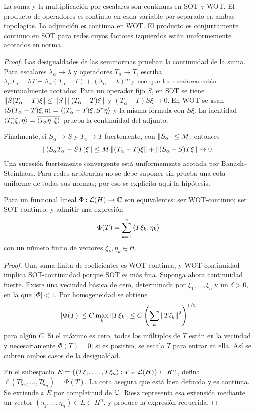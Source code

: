 \begin{proposicion}\label{v3:operaciones-topologias}
La suma y la multiplicación por escalares son continuas en SOT y WOT. El producto de operadores es continuo en cada variable por separado en ambas topologías. La adjunción es continua en WOT. El producto es conjuntamente continuo en SOT para redes cuyos factores izquierdos están uniformemente acotados en norma.
\end{proposicion}
\begin{proof}
Las desigualdades de las seminormas prueban la continuidad de la suma. Para escalares $\lambda_\alpha\to\lambda$ y operadores $T_\alpha\to T$, escriba
$\lambda_\alpha T_\alpha-\lambda T=\lambda_\alpha(T_\alpha-T)+(\lambda_\alpha-\lambda)T$ y use que los escalares están eventualmente acotados. Para un operador fijo $S$, en SOT se tiene $\left\lVert S(T_\alpha-T)\xi\right\rVert\le\left\lVert S\right\rVert\left\lVert(T_\alpha-T)\xi\right\rVert$ y $(T_\alpha-T)S\xi\to0$. En WOT se usan $\left\langle S(T_\alpha-T)\xi,\eta\right\rangle=\left\langle(T_\alpha-T)\xi,S^*\eta\right\rangle$ y la misma fórmula con $S\xi$. La identidad $\left\langle T_\alpha^*\xi,\eta\right\rangle=\overline{\left\langle T_\alpha\eta,\xi\right\rangle}$ prueba la continuidad del adjunto.

Finalmente, si $S_\alpha\to S$ y $T_\alpha\to T$ fuertemente, con $\left\lVert S_\alpha\right\rVert\le M$, entonces
\[
 \left\lVert(S_\alpha T_\alpha-ST)\xi\right\rVert
 \le M\left\lVert(T_\alpha-T)\xi\right\rVert+\left\lVert(S_\alpha-S)T\xi\right\rVert\to0.
\]
Una sucesión fuertemente convergente está uniformemente acotada por Banach--Steinhaus. Para redes arbitrarias no se debe suponer sin prueba una cota uniforme de todas sus normas; por eso se explicita aquí la hipótesis.
\end{proof}

\begin{teorema}\label{v3:dual-sot-wot}
Para un funcional lineal $\Phi:\mathcal L(H)\to\mathbb C$ son equivalentes: ser WOT-continuo; ser SOT-continuo; y admitir una expresión
\[
 \Phi(T)=\sum_{k=1}^n\left\langle T\xi_k,\eta_k\right\rangle
\]
con un número finito de vectores $\xi_k,\eta_k\in H$.
\end{teorema}
\begin{proof}
Una suma finita de coeficientes es WOT-continua, y WOT-continuidad implica SOT-continuidad porque SOT es más fina. Suponga ahora continuidad fuerte. Existe una vecindad básica de cero, determinada por $\xi_1,\ldots,\xi_n$ y un $\delta>0$, en la que $|\Phi|<1$. Por homogeneidad se obtiene
\[
 |\Phi(T)|\le C\max_k\left\lVert T\xi_k\right\rVert
 \le C\left(\sum_k\left\lVert T\xi_k\right\rVert^2\right)^{1/2}
\]
para algún $C$. Si el máximo es cero, todos los múltiplos de $T$ están en la vecindad y necesariamente $\Phi(T)=0$; si es positivo, se escala $T$ para entrar en ella. Así se cubren ambos casos de la desigualdad.

En el subespacio $E=\{(T\xi_1,\ldots,T\xi_n):T\in\mathcal L(H)\}\subset H^n$, defina $\ell(T\xi_1,\ldots,T\xi_n)=\Phi(T)$. La cota asegura que está bien definida y es continua. Se extiende a $\overline E$ por completitud de $\mathbb C$. Riesz representa esa extensión mediante un vector $(\eta_1,\ldots,\eta_n)\in\overline E\subset H^n$, y produce la expresión requerida.
\end{proof}

